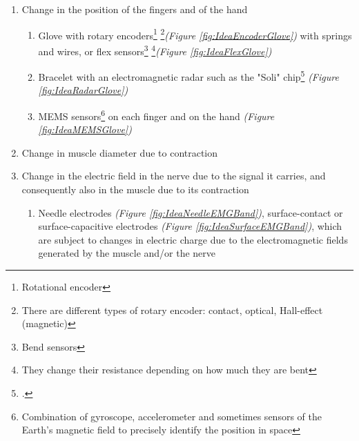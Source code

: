 \documentclass[a4paper, 10pt, final]{article} %
\begin{document}
    \begin{enumerate}[label=\emph{(\arabic*)}]
        \item Change in the position of the fingers and of the hand
            \begin{enumerate}[label=\emph{(\alph*)}]
                \item Glove with rotary encoders\footnote{Rotational encoder} \footnote{There are different types of rotary encoder: contact, optical, Hall-effect (magnetic)}\emph{(Figure \ref{fig:IdeaEncoderGlove})} with springs and wires, or flex sensors\footnote{Bend sensors} \footnote{They change their resistance depending on how much they are bent}\emph{(Figure \ref{fig:IdeaFlexGlove})}
                \item Bracelet with an electromagnetic radar such as the "Soli" chip\footcite[]{GoogleATAP:Wiki} \emph{(Figure \ref{fig:IdeaRadarGlove})}
                \item MEMS sensors\footnote{Combination of gyroscope, accelerometer and sometimes sensors of the Earth's magnetic field to precisely identify the position in space} on each finger and on the hand \emph{(Figure \ref{fig:IdeaMEMSGlove})}
            \end{enumerate}
        \item Change in muscle diameter due to contraction
        \item Change in the electric field in the nerve due to the signal it carries, and consequently also in the muscle due to its contraction \label{ItemDeltaChoice}
            \begin{enumerate}[label=\emph{(\alph*)}]
                \item Needle electrodes \emph{(Figure \ref{fig:IdeaNeedleEMGBand})}, surface-contact or surface-capacitive electrodes \emph{(Figure \ref{fig:IdeaSurfaceEMGBand})}, which are subject to changes in electric charge due to the electromagnetic fields generated by the muscle and/or the nerve \label{ItemEMG}
            \end{enumerate}
    \end{enumerate}
\end{document}
